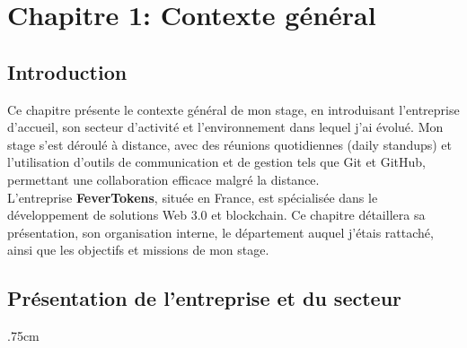 \chapter*{Chapitre 1: Contexte général}       

\section{Introduction}
Ce chapitre présente le contexte général de mon stage, en introduisant l'entreprise d'accueil, son secteur d'activité et l'environnement dans lequel j'ai évolué. Mon stage s'est déroulé à distance, avec des réunions quotidiennes (daily standups) et l'utilisation d'outils de communication et de gestion tels que Git et GitHub, permettant une collaboration efficace malgré la distance.\\[1mm]
L'entreprise \textbf{\textcolor{ftRed}{FeverTokens}}, située en France, est spécialisée dans le développement de solutions Web 3.0 et blockchain. Ce chapitre détaillera sa présentation, son organisation interne, le département auquel j'étais rattaché, ainsi que les objectifs et missions de mon stage.\\[.5cm]


\section{Présentation de l'entreprise et du secteur}
    \leftskip.75cm
